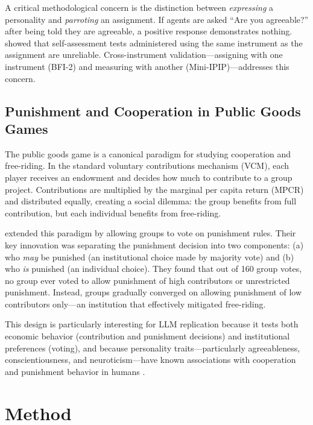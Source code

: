 \documentclass[12pt, a4paper]{article}
\begin{document}
A critical methodological concern is the distinction between \emph{expressing} a personality and \emph{parroting} an assignment. If agents are asked ``Are you agreeable?'' after being told they are agreeable, a positive response demonstrates nothing. \citet{gupta2024self} showed that self-assessment tests administered using the same instrument as the assignment are unreliable. Cross-instrument validation---assigning with one instrument (BFI-2) and measuring with another (Mini-IPIP)---addresses this concern.

\subsection{Punishment and Cooperation in Public Goods Games}

The public goods game is a canonical paradigm for studying cooperation and free-riding. In the standard voluntary contributions mechanism (VCM), each player receives an endowment and decides how much to contribute to a group project. Contributions are multiplied by the marginal per capita return (MPCR) and distributed equally, creating a social dilemma: the group benefits from full contribution, but each individual benefits from free-riding.

\citet{ertan2009who} extended this paradigm by allowing groups to vote on punishment rules. Their key innovation was separating the punishment decision into two components: (a) who \emph{may} be punished (an institutional choice made by majority vote) and (b) who \emph{is} punished (an individual choice). They found that out of 160 group votes, no group ever voted to allow punishment of high contributors or unrestricted punishment. Instead, groups gradually converged on allowing punishment of low contributors only---an institution that effectively mitigated free-riding.

This design is particularly interesting for LLM replication because it tests both economic behavior (contribution and punishment decisions) and institutional preferences (voting), and because personality traits---particularly agreeableness, conscientiousness, and neuroticism---have known associations with cooperation and punishment behavior in humans \citep{volk2012personality}.

\section{Method}
\end{document}
